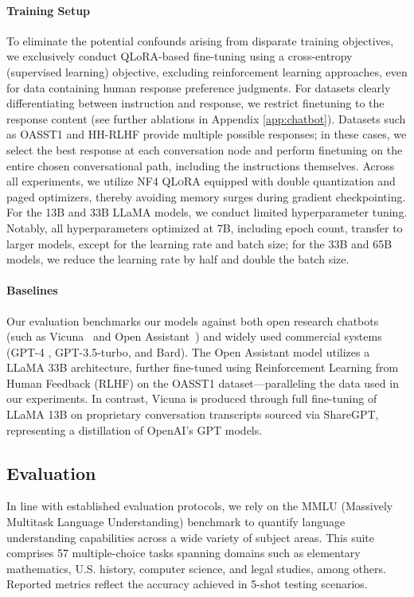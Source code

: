 \paragraph{Training Setup} To eliminate the potential confounds arising from disparate training objectives, we exclusively conduct QLoRA-based fine-tuning using a cross-entropy (supervised learning) objective, excluding reinforcement learning approaches, even for data containing human response preference judgments. For datasets clearly differentiating between instruction and response, we restrict finetuning to the response content (see further ablations in Appendix \ref{app:chatbot}). Datasets such as OASST1 and HH-RLHF provide multiple possible responses; in these cases, we select the best response at each conversation node and perform finetuning on the entire chosen conversational path, including the instructions themselves. Across all experiments, we utilize NF4 \textsc{QLoRA} equipped with double quantization and paged optimizers, thereby avoiding memory surges during gradient checkpointing. For the 13B and 33B LLaMA models, we conduct limited hyperparameter tuning. Notably, all hyperparameters optimized at 7B, including epoch count, transfer to larger models, except for the learning rate and batch size; for the 33B and 65B models, we reduce the learning rate by half and double the batch size.

\paragraph{Baselines} Our evaluation benchmarks our models against both open research chatbots (such as Vicuna~\citep{vicuna2023} and Open Assistant~\citep{kopf2023openassistant}) and widely used commercial systems (GPT-4 \citep{openai2023gpt}, GPT-3.5-turbo, and Bard). The Open Assistant model utilizes a LLaMA 33B architecture, further fine-tuned using Reinforcement Learning from Human Feedback (RLHF) on the OASST1 dataset—paralleling the data used in our experiments. In contrast, Vicuna is produced through full fine-tuning of LLaMA 13B on proprietary conversation transcripts sourced via ShareGPT, representing a distillation of OpenAI's GPT models.

\subsection{Evaluation}

In line with established evaluation protocols, we rely on the MMLU (Massively Multitask Language Understanding) benchmark \citep{hendrycksmeasuring} to quantify language understanding capabilities across a wide variety of subject areas. This suite comprises 57 multiple-choice tasks spanning domains such as elementary mathematics, U.S. history, computer science, and legal studies, among others. Reported metrics reflect the accuracy achieved in 5-shot testing scenarios.

